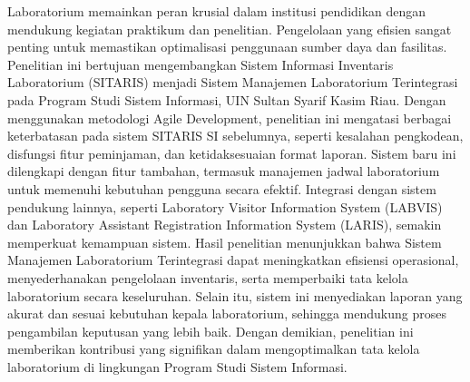 \noindent
\fontsize{10pt}{12pt}\selectfont
Laboratorium memainkan peran krusial dalam institusi pendidikan dengan mendukung kegiatan praktikum dan penelitian. Pengelolaan yang efisien sangat penting untuk memastikan optimalisasi penggunaan sumber daya dan fasilitas. Penelitian ini bertujuan mengembangkan Sistem Informasi Inventaris Laboratorium (SITARIS) menjadi Sistem Manajemen Laboratorium Terintegrasi pada Program Studi Sistem Informasi, UIN Sultan Syarif Kasim Riau. Dengan menggunakan metodologi Agile Development, penelitian ini mengatasi berbagai keterbatasan pada sistem SITARIS SI sebelumnya, seperti kesalahan pengkodean, disfungsi fitur peminjaman, dan ketidaksesuaian format laporan. Sistem baru ini dilengkapi dengan fitur tambahan, termasuk manajemen jadwal laboratorium untuk memenuhi kebutuhan pengguna secara efektif. Integrasi dengan sistem pendukung lainnya, seperti Laboratory Visitor Information System (LABVIS) dan Laboratory Assistant Registration Information System (LARIS), semakin memperkuat kemampuan sistem. Hasil penelitian menunjukkan bahwa Sistem Manajemen Laboratorium Terintegrasi dapat meningkatkan efisiensi operasional, menyederhanakan pengelolaan inventaris, serta memperbaiki tata kelola laboratorium secara keseluruhan. Selain itu, sistem ini menyediakan laporan yang akurat dan sesuai kebutuhan kepala laboratorium, sehingga mendukung proses pengambilan keputusan yang lebih baik. Dengan demikian, penelitian ini memberikan kontribusi yang signifikan dalam mengoptimalkan tata kelola laboratorium di lingkungan Program Studi Sistem Informasi.\\
 \\